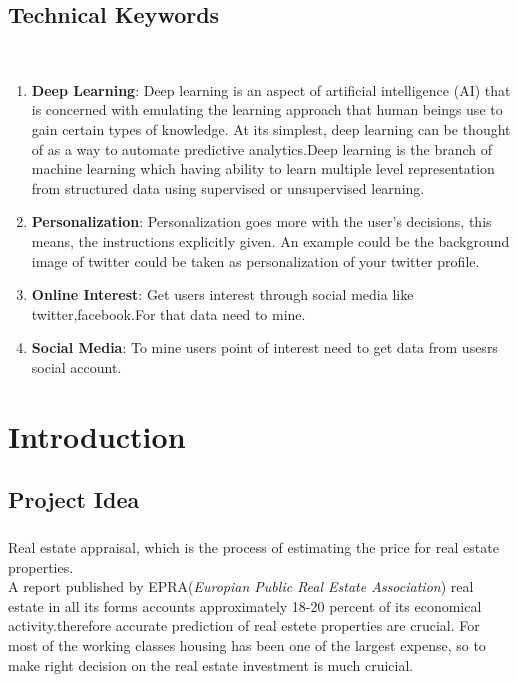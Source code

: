 \documentclass[11pt,fleqn]{book} %
\begin{document}
\section{Technical Keywords}\
\begin{enumerate}
    \item \textbf{\LARGE\color{ocre}Deep Learning}:  Deep learning is an aspect of artificial intelligence (AI) that is concerned with emulating the learning approach that human beings use to gain certain types of knowledge. At its simplest, deep learning can be thought of as a way to automate predictive analytics.Deep learning is the branch of machine learning which having ability to learn multiple level representation from structured data using supervised or unsupervised learning.
    \vspace{2mm}
    \item \textbf{\LARGE\color{ocre}Personalization}: Personalization goes more with the user's decisions, this means, the instructions explicitly given. An example could be the background image of twitter could be taken as personalization of your twitter profile.
    \vspace{2mm}
	\item \textbf{\LARGE\color{ocre}Online Interest}: Get users interest through social media like twitter,facebook.For that data need to mine.
	\vspace{2mm}
	\item \textbf{\LARGE\color{ocre}Social Media}: To  mine users point of interest need to get data from usesrs social account.

 \end{enumerate}


\chapter{Introduction}

\section{Project Idea}
\paragraph*{} Real estate appraisal, which is the process of estimating the price for real estate properties.\\
A report published by EPRA(\emph{Europian Public Real Estate Association}) real estate in all its forms accounts approximately 18-20 percent of its economical activity.therefore accurate prediction of real estete properties are crucial. For most of the working classes housing has been one of the largest expense, so to make right decision on the real estate investment is much cruicial.
\end{document}
